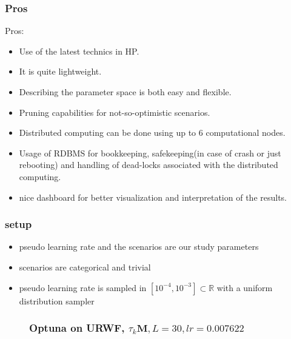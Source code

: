   \begin{frame}
    \frametitle{\optuna Pros}
    \pause
    Pros:
    \begin{itemize}
      \pause
      \item Use of the latest technics in \ac{HP}\cite{Hutter2019}\cite{Akiba2019}.
      \pause
      \item It is quite lightweight.
      \pause
      \item Describing the parameter space is both easy and flexible.
      \pause
      \item Pruning capabilities for not-so-optimistic scenarios.
      \pause
      \item Distributed computing can be done using up to 6 computational nodes.
      \pause
      \item Usage of \ac{RDBMS} for bookkeeping, safekeeping(in case of crash or just rebooting) and handling of dead-locks associated with the distributed computing.
      \pause
      \item nice dashboard for better visualization and interpretation of the results.  
    \end{itemize}
  \end{frame}

  \begin{frame}
    \frametitle{\optuna setup}
    \begin{itemize}
      \pause
      \item pseudo learning rate and the scenarios are our study parameters
      \pause
      \item scenarios are categorical and trivial
      \pause
      \item pseudo learning rate is sampled in $\left[10^{-4},10^{-3}\right] \subset \mathbb{R}$ with a uniform distribution sampler
    \end{itemize}
  \end{frame}


  
  \begin{frame}
    \begin{figure}
      \frametitle{Optuna on URWF, $\tau_k\boldsymbol{M},L=30,lr=0.007622$}
      \centering
      \resizebox{0.9\textwidth}{!}{}
      \label{fig:urwf_optuna}
    \end{figure}
  \end{frame}